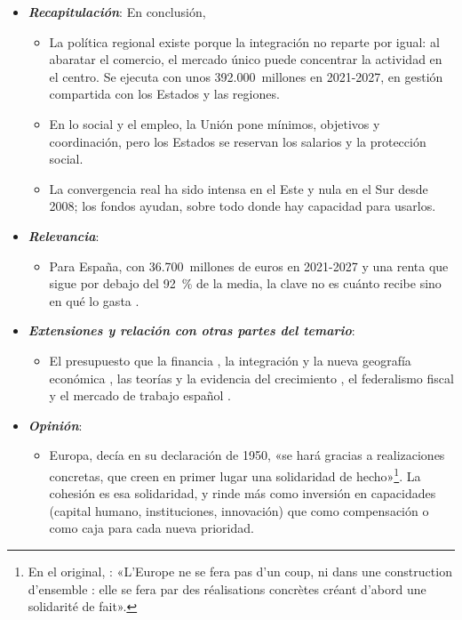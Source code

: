 \documentclass[11pt]{article}
\begin{document}
\begin{itemize}
\item \textbf{\emph{Recapitulación}}: En conclusión,
  \begin{itemize}
  \item La política regional existe porque la integración no reparte por igual: al abaratar el comercio, el mercado único puede concentrar la actividad en el centro. Se ejecuta con unos 392.000~millones en 2021-2027, en gestión compartida con los Estados y las regiones.
  \item En lo social y el empleo, la Unión pone mínimos, objetivos y coordinación, pero los Estados se reservan los salarios y la protección social.
  \item La convergencia real ha sido intensa en el Este y nula en el Sur desde 2008; los fondos ayudan, sobre todo donde hay capacidad para usarlos.
  \end{itemize}
\item \textbf{\emph{Relevancia}}:
  \begin{itemize}
  \item Para España, con 36.700~millones de euros en 2021-2027 y una renta que sigue por debajo del 92~\% de la media, la clave no es cuánto recibe sino en qué lo gasta  .
  \end{itemize}
\item \textbf{\emph{Extensiones y relación con otras partes del temario}}:
  \begin{itemize}
  \item El presupuesto que la financia , la integración y la nueva geografía económica  , las teorías y la evidencia del crecimiento  , el federalismo fiscal  y el mercado de trabajo español .
  \end{itemize}
\item \textbf{\emph{Opinión}}:
  \begin{itemize}
  \item Europa, decía  en su declaración de 1950, «se hará gracias a realizaciones concretas, que creen en primer lugar una solidaridad de hecho»\footnote{En el original, \textcite{Schuman1950Declaracion}: «L'Europe ne se fera pas d'un coup, ni dans une construction d'ensemble : elle se fera par des réalisations concrètes créant d'abord une solidarité de fait».}. La cohesión es esa solidaridad, y rinde más como inversión en capacidades (capital humano, instituciones, innovación) que como compensación o como caja para cada nueva prioridad.


\end{itemize}
\end{itemize}
\end{document}
